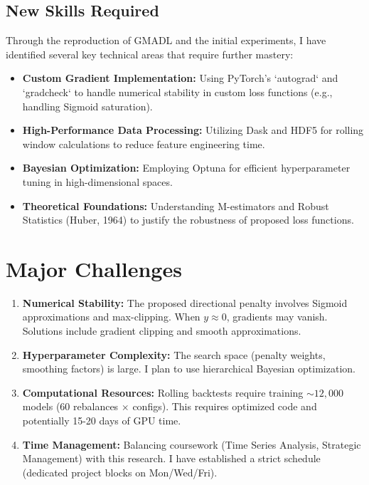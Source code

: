 \documentclass[openany]{book}
\numberwithin{figure}{chapter}
\numberwithin{equation}{chapter}
\begin{document}
\section{New Skills Required}
Through the reproduction of GMADL and the initial experiments, I have identified several key technical areas that require further mastery:
\begin{itemize}
    \item \textbf{Custom Gradient Implementation:} Using PyTorch's `autograd` and `gradcheck` to handle numerical stability in custom loss functions (e.g., handling Sigmoid saturation).
    \item \textbf{High-Performance Data Processing:} Utilizing Dask and HDF5 for rolling window calculations to reduce feature engineering time.
    \item \textbf{Bayesian Optimization:} Employing Optuna for efficient hyperparameter tuning in high-dimensional spaces.
    \item \textbf{Theoretical Foundations:} Understanding M-estimators and Robust Statistics (Huber, 1964) to justify the robustness of proposed loss functions.
\end{itemize}

\chapter{Major Challenges}
\begin{enumerate}
    \item \textbf{Numerical Stability:} The proposed directional penalty involves Sigmoid approximations and max-clipping. When $y \approx 0$, gradients may vanish. Solutions include gradient clipping and smooth approximations.
    \item \textbf{Hyperparameter Complexity:} The search space (penalty weights, smoothing factors) is large. I plan to use hierarchical Bayesian optimization.
    \item \textbf{Computational Resources:} Rolling backtests require training $\sim 12,000$ models (60 rebalances $\times$ configs). This requires optimized code and potentially 15-20 days of GPU time.
    \item \textbf{Time Management:} Balancing coursework (Time Series Analysis, Strategic Management) with this research. I have established a strict schedule (dedicated project blocks on Mon/Wed/Fri).
\end{enumerate}
\end{document}
